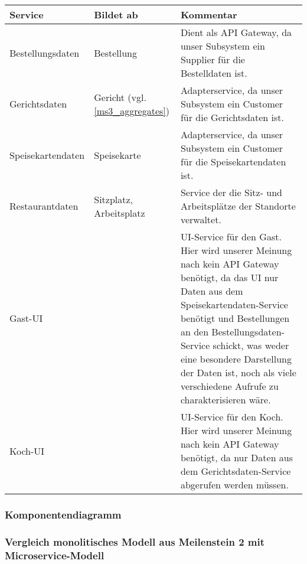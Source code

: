 \begin{tabu} to \linewidth {X|X|X}
\hline{}
Service &Bildet ab &Kommentar \\
\hline
Bestellungsdaten &Bestellung &Dient als API Gateway, da
  unser Subsystem ein Supplier f\"ur die Bestelldaten ist.
  \\
\hline
Gerichtsdaten &Gericht (vgl. \ref{ms3_aggregates})
  &Adapterservice, da unser Subsystem ein Customer f\"ur
  die Gerichtsdaten ist.\\
\hline
Speisekartendaten &Speisekarte &Adapterservice, da unser
  Subsystem ein Customer f\"ur die Speisekartendaten ist.\\
\hline
Restaurantdaten &Sitzplatz, Arbeitsplatz &Service der die
  Sitz- und Arbeitspl\"atze der Standorte verwaltet. \\
\hline
Gast-UI & &UI-Service f\"ur den Gast. Hier wird unserer
  Meinung nach kein API Gateway ben\"otigt, da das UI nur
  Daten aus dem Speisekartendaten-Service ben\"otigt und
  Bestellungen an den Bestellungsdaten-Service schickt,
  was weder eine besondere Darstellung der Daten ist, noch
  als viele verschiedene Aufrufe zu charakterisieren
  w\"are. \\
\hline
Koch-UI & &UI-Service f\"ur den Koch. Hier wird unserer
  Meinung nach kein API Gateway ben\"otigt, da nur Daten
  aus dem Gerichtsdaten-Service abgerufen werden m\"ussen.
  \\
\hline
\end{tabu}

\subsubsection{Komponentendiagramm}


\subsubsection{Vergleich monolitisches Modell aus
  Meilenstein 2 mit Microservice-Modell}

